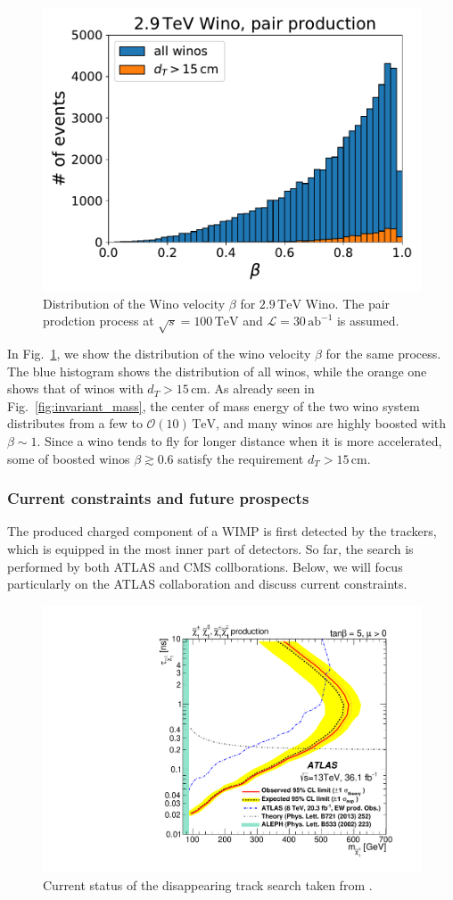 \documentclass[12pt,twoside,book]{article}
\begin{document}
\begin{figure}[t]
  \centering
  \includegraphics[width=0.5\hsize]{beta.pdf}
  \caption{
    Distribution of the Wino velocity $\beta$ for $2.9\,\mathrm{TeV}$ Wino.
    The pair prodction process at $\sqrt{s}=100\,\mathrm{TeV}$ and $\mathcal{L} = 30\,\mathrm{ab}^{-1}$ is assumed.
  }
  \label{fig:beta}
\end{figure}

In Fig.~\ref{fig:beta}, we show the distribution of the wino velocity $\beta$ for the same process.
The blue histogram shows the distribution of all winos, while the orange one shows that of winos with $d_T > 15\,\mathrm{cm}$.
As already seen in Fig.~\ref{fig:invariant_mass}, the center of mass energy of the two wino system distributes from a few to $\mathcal{O} (10) \,\mathrm{TeV}$, and many winos are highly boosted with $\beta \sim 1$.
Since a wino tends to fly for longer distance when it is more accelerated, some of boosted winos $\beta \gtrsim 0.6$ satisfy the requirement $d_T > 15\,\mathrm{cm}$.


\subsubsection*{Current constraints and future prospects}

The produced charged component of a WIMP is first detected by the trackers, which is equipped in the most inner part of detectors.
So far, the search is performed by both ATLAS \cite{Aaboud:2017mpt} and CMS \cite{Sirunyan:2018ldc} collborations.
Below, we will focus particularly on the ATLAS collaboration and discuss current constraints.

\begin{figure}[t]
  \centering
  \includegraphics[width=0.5\hsize]{ATLAS_disappearing_track.pdf}
  \caption{Current status of the disappearing track search taken from \cite{Aaboud:2017mpt}.}
  \label{fig:ATLAS_disappearing_track}
\end{figure}
\end{document}
